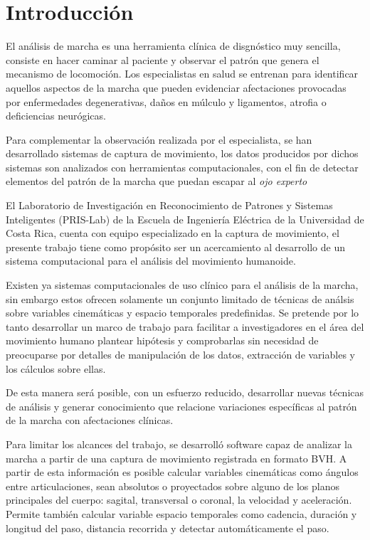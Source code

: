 \chapter{Introducción}

El análisis de marcha es una herramienta clínica de disgnóstico muy sencilla, consiste en hacer caminar al paciente y observar el patrón que genera el mecanismo de locomoción. Los especialistas en salud se entrenan para identificar aquellos aspectos de la marcha que pueden evidenciar afectaciones provocadas por enfermedades degenerativas, daños en múlculo y ligamentos, atrofia o deficiencias neurógicas. 

Para complementar la observación realizada por el especialista, se han desarrollado sistemas de captura de movimiento, los datos producidos por dichos sistemas son analizados con herramientas computacionales, con el fin de detectar elementos del patrón de la marcha que puedan escapar al \emph{ojo experto}

El Laboratorio de Investigación en Reconocimiento de Patrones y Sistemas Inteligentes (PRIS-Lab) de la Escuela de Ingeniería Eléctrica de la Universidad de Costa Rica, cuenta con equipo especializado en la captura de movimiento, el presente trabajo tiene como propósito ser un acercamiento al desarrollo de un sistema computacional para el análisis del movimiento humanoide. 

Existen ya sistemas computacionales de uso clínico para el análisis de la marcha, sin embargo estos ofrecen solamente un conjunto limitado de técnicas de análsis sobre variables cinemáticas y espacio temporales predefinidas. Se pretende por lo tanto desarrollar un marco de trabajo para facilitar a investigadores en el área del movimiento humano plantear hipótesis y comprobarlas sin necesidad de preocuparse por detalles de manipulación de los datos, extracción de variables y los cálculos sobre ellas. 

De esta manera será posible, con un esfuerzo reducido, desarrollar nuevas técnicas de análisis y generar conocimiento que relacione variaciones específicas al patrón de la marcha con afectaciones clínicas. 

Para limitar los alcances del trabajo, se desarrolló software capaz de analizar la marcha a partir de una captura de movimiento registrada en formato BVH. A partir de esta información es posible calcular variables cinemáticas como ángulos entre articulaciones, sean absolutos o proyectados sobre alguno de los planos principales del cuerpo: sagital, transversal o coronal, la velocidad y aceleración. Permite también calcular variable espacio temporales como cadencia, duración y longitud del paso, distancia recorrida y detectar automáticamente el paso. 

